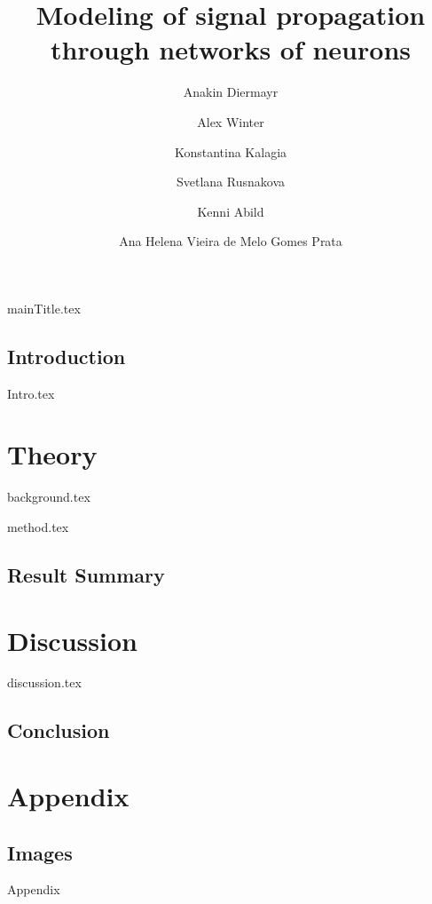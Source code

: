 \documentclass[printGloss]{myRUCProject}
\title{Modeling of signal propagation through networks of neurons}
\author{ Anakin Diermayr \and  Alex Winter \and Konstantina Kalagia \and Svetlana Rusnakova \and Kenni Abild \and  Ana Helena Vieira de Melo Gomes Prata }
\begin{document}

{mainTitle.tex}
\tableofcontents

\printacronyms%










\newpage
{}
\chapter*{Introduction} 
{Intro.tex}

\part{Theory}

{background.tex}

\newpage

{method.tex}



\newpage
\chapter{Result Summary}


\newpage
\part{Discussion}
{discussion.tex}




\newpage
\chapter{Conclusion}


\appendix
\part*{Appendix}

\chapter{Images}\label{ap:sfd}
{Appendix}
\end{document}
